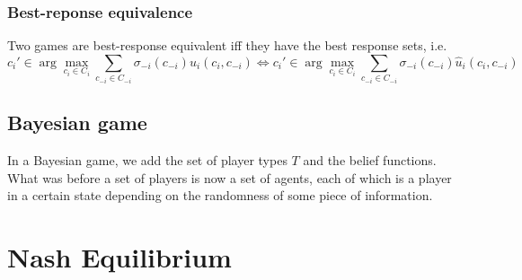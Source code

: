 \documentclass[12pt, openany]{report}
\theoremstyle{definition}
\begin{document}
\subsection{Best-reponse equivalence}
Two games are best-response equivalent iff they have the best response sets, i.e.
\begin{equation}
	c_i'\in \arg\max_{c_i\in C_i} \sum_{c_{-i}\in C_{-i}} \sigma_{-i}(c_{-i})u_i(c_i,c_{-i}) \iff c_i'\in \arg\max_{c_i\in C_i} \sum_{c_{-i}\in C_{-i}} \sigma_{-i}(c_{-i})\hat u_i(c_i,c_{-i})
\end{equation}
\section{Bayesian game}
In a Bayesian game, we add the set of player types $T$ and the belief functions. What was before a set of players is now a set of agents, each of which is a player in a certain state depending on the randomness of some piece of information.
\chapter{Nash Equilibrium}
\end{document}

